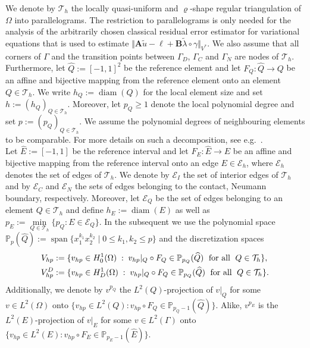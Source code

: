 \documentclass[12pt,twoside,reqno]{amsart}
\theoremstyle{definition}
\numberwithin{equation}{section}
\newcommand{\B} {\bm{B}}
\newcommand  {\T}   {\mathscr T}
\newcommand{\norm}[1]    {\Vert #1 \Vert}
\begin{document}
            We denote by $\T_h$ the locally quasi-uniform and $\varrho$-shape regular triangulation of $\Omega$ into parallelograms. The restriction to parallelograms is only needed for the analysis of the arbitrarily chosen classical residual error estimator for variational equations that is used to estimate $\norm{\bm{A}\tilde{u}-\bm{\ell}+\B{\tilde{\lambda}}\circ\gamma}_{V^*}$. We also assume that  all corners of $\Gamma$ and the transition points between $\Gamma_D$, $\Gamma_C$ and $\Gamma_N$ are nodes of $\T_h$.
            Furthermore, let $\widehat{Q}:=[-1,1]^2$ be the reference element and let $F_Q:\widehat{Q}\to Q$ be an affine and bijective mapping from the reference element onto an element $Q\in\T_h$. We write $h_Q:=\operatorname{diam}(Q)$ for the local element size and set $h:=(h_Q)_{Q\in\T_h}$. Moreover, let $p_Q\geq 1$ denote the local polynomial degree and set $p:=(p_Q)_{Q\in\T_h}$. We assume the polynomial degrees of neighbouring elements to be comparable.
            For more details on such a decomposition, see e.g.~\cite{Melenk2001a}.\\
            Let $\widehat{E}:=[-1,1]$ be the reference interval and let $F_E:\widehat{E}\to E$ be an affine and bijective mapping from the reference interval onto an edge $E\in\mathcal{E}_h$, where $\mathcal{E}_h$ denotes the set of edges of $\T_h$.
            We denote by $\mathcal{E}_I$ the set of interior edges of $\T_h$ and by $\mathcal{E}_C$ and $\mathcal{E}_N$ the sets of edges belonging to the contact, Neumann boundary, respectively. Moreover, let $\mathcal{E}_Q$ be the set of edges belonging to an element $Q\in \T_h$ and define $h_E:=\operatorname{diam}(E)$ as well as $p_E:=\min\limits_{Q\in \T_h}\{p_Q: E\in \mathcal{E}_Q\}$.
            In the subsequent we use the polynomial space
$      \mathbb{P}_p(\widehat{Q}):=\operatorname{span}\big\{x_1^{k_1}x_2^{k_2}\;|\;0 \leq k_1, k_2 \leq p\} $
            and the discretization spaces
            \begin{equation*}
            \aligned
                V_{hp}&:=\{v_{hp}\in H_0^1(\Omega)\;:\; v_{hp}|_Q\circ F_Q\in \mathbb{P}_{p_Q}(\widehat{Q})\;\text{ for all }\; Q\in\mathcal{T}_h\},\\
                V_{hp}^D&:=\{v_{hp}\in H_D^1(\Omega)\;:\; v_{hp}|_Q\circ F_Q\in \mathbb{P}_{p_Q}(\widehat{Q})\;\text{ for all }\; Q\in\mathcal{T}_h\}.
                \endaligned
            \end{equation*}
            Additionally, we denote by $v^{p_Q}$ the $L^2(Q)$-projection of $v|_Q$ for some $v \in L^2(\Omega)$ onto $\{v_{hp} \in L^2(Q): v_{hp}\circ F_Q\in \mathbb{P}_{p_Q-1}(\widehat{Q}) \}$. Alike, $v^{p_E}$ is the $L^2(E)$-projection of $v|_E$ for some $v \in L^2(\Gamma)$ onto $\{v_{hp} \in L^2(E): v_{hp}\circ F_E\in \mathbb{P}_{p_E-1}(\widehat{E}) \}$.            
\end{document}
